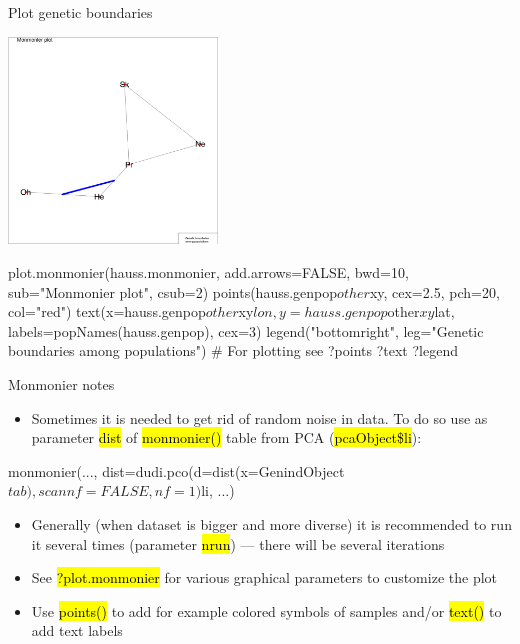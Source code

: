 \documentclass[compress, ucs, xelatex, 11pt, xcolor=svgnames,
  hyperref={
    bookmarks=true,
    unicode=true,
    colorlinks=true,
    pdftitle={Molecular data in R},
    plainpages=false,
    pdfauthor={Vojtech Zeisek},
    pdfsubject={Course about phylogeny and evolution in R},
    pdfcreator={XeLaTeX},
    pdfkeywords={R, evolution, phylogeny, molecular data},
    linkcolor=Tomato,
    anchorcolor=SaddleBrown,
    citecolor=Goldenrod,
    filecolor=DarkMagenta,
    menucolor=Sienna,
    urlcolor=DarkTurquoise,
    pdftex},
  url={hyphens, lowtilde} %
  ]{beamer}
\renewcommand{\texttt}[1]{\hl{\ttfamily #1}}
\begin{document}
\begin{frame}[fragile]{Plot genetic boundaries}
\begin{multicols}{2}
  \includegraphics[height=5.5cm]{monmonier.png}
  \begin{spluscode}
    plot.monmonier(hauss.monmonier,
      add.arrows=FALSE, bwd=10,
      sub="Monmonier plot", csub=2)
    points(hauss.genpop$other$xy,
      cex=2.5, pch=20, col="red")
    text(x=hauss.genpop$other$xy$lon,
      y=hauss.genpop$other$xy$lat,
      labels=popNames(hauss.genpop),
      cex=3)
    legend("bottomright",
      leg="Genetic boundaries\n
      among populations")
    # For plotting see
    ?points
    ?text
    ?legend
  \end{spluscode}
\end{multicols}
\end{frame}

\begin{frame}[fragile]{Monmonier notes}
  \begin{itemize}
    \item Sometimes it is needed to get rid of random noise in data. To do so use as parameter \texttt{dist} of \texttt{monmonier()} table from PCA (\texttt{pcaObject\$li}):
  \end{itemize}
  \begin{spluscode}
    monmonier(..., dist=dudi.pco(d=dist(x=GenindObject$tab),
      scannf=FALSE, nf=1)$li, ...)
  \end{spluscode}
  \begin{itemize}
    \item Generally (when dataset is bigger and more diverse) it is recommended to run it several times (parameter \texttt{nrun}) --- there will be several iterations
    \item See \texttt{?plot.monmonier} for various graphical parameters to customize the plot
    \item Use \texttt{points()} to add for example colored symbols of samples and/or \texttt{text()} to add text labels
  \end{itemize}
\end{frame}
\end{document}
